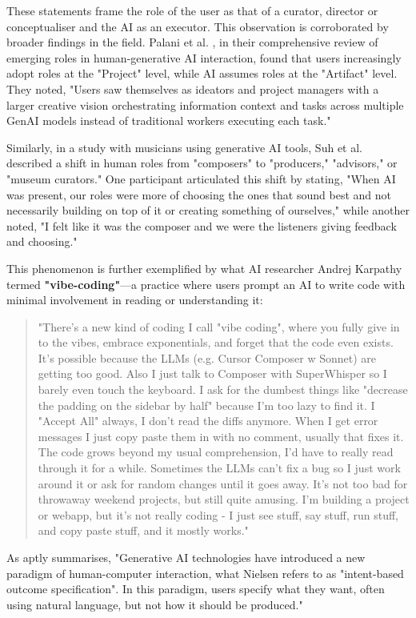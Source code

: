 These statements frame the role of the user as that of a curator, director or conceptualiser and the AI as an executor. This observation is corroborated by broader findings in the field. Palani et al. \cite{Palani2024-on}, in their comprehensive review of emerging roles in human-generative AI interaction, found that users increasingly adopt roles at the "Project" level, while AI assumes roles at the "Artifact" level. They noted, "Users saw themselves as ideators and project managers with a larger creative vision orchestrating information context and tasks across multiple GenAI models instead of traditional workers executing each task."

Similarly, in a study with musicians using generative AI tools, Suh et al. \cite{Suh2021-cj} described a shift in human roles from "composers" to "producers," "advisors," or "museum curators." One participant articulated this shift by stating, "When AI was present, our roles were more of choosing the ones that sound best and not necessarily building on top of it or creating something of ourselves," while another noted, "I felt like it was the composer and we were the listeners giving feedback and choosing."

This phenomenon is further exemplified by what AI researcher Andrej Karpathy termed \textbf{"vibe-coding"}—a practice where users prompt an AI to write code with minimal involvement in reading or understanding it:

\begin{quote}
"There's a new kind of coding I call "vibe coding", where you fully give in to the vibes, embrace exponentials, and forget that the code even exists. It's possible because the LLMs (e.g. Cursor Composer w Sonnet) are getting too good. Also I just talk to Composer with SuperWhisper so I barely even touch the keyboard. I ask for the dumbest things like "decrease the padding on the sidebar by half" because I'm too lazy to find it. I "Accept All" always, I don't read the diffs anymore. When I get error messages I just copy paste them in with no comment, usually that fixes it. The code grows beyond my usual comprehension, I'd have to really read through it for a while. Sometimes the LLMs can't fix a bug so I just work around it or ask for random changes until it goes away. It's not too bad for throwaway weekend projects, but still quite amusing. I'm building a project or webapp, but it's not really coding - I just see stuff, say stuff, run stuff, and copy paste stuff, and it mostly works."
\end{quote}
As \cite{Weisz2024-io} aptly summarises, "Generative AI technologies have introduced a new paradigm of human-computer interaction, what Nielsen refers to as "intent-based outcome specification". In this paradigm, users specify what they want, often using natural language, but not how it should be produced."

